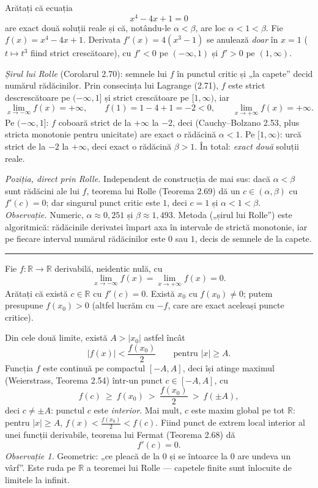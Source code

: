Arătați că ecuația
\[ x^{4}-4x+1=0 \]
are exact două soluții reale și că, notându-le $\alpha<\beta$, are loc $\alpha<1<\beta$.
\sol Fie $f(x)=x^{4}-4x+1$. Derivata $f'(x)=4(x^{3}-1)$ se anulează \emph{doar} în $x=1$ ($t\mapsto t^{3}$ fiind strict crescătoare), cu $f'<0$ pe $(-\infty,1)$ și $f'>0$ pe $(1,\infty)$.

\emph{Șirul lui Rolle} (Corolarul 2.70): semnele lui $f$ în punctul critic și „la capete'' decid numărul rădăcinilor. Prin consecința lui Lagrange (2.71), $f$ este strict descrescătoare pe $(-\infty,1]$ și strict crescătoare pe $[1,\infty)$, iar
\[ \lim_{x\to-\infty}f(x)=+\infty,\qquad f(1)=1-4+1=-2<0,\qquad \lim_{x\to+\infty}f(x)=+\infty . \]
Pe $(-\infty,1]$: $f$ coboară strict de la $+\infty$ la $-2$, deci (Cauchy--Bolzano 2.53, plus stricta monotonie pentru unicitate) are exact o rădăcină $\alpha<1$. Pe $[1,\infty)$: urcă strict de la $-2$ la $+\infty$, deci exact o rădăcină $\beta>1$. În total: \emph{exact două} soluții reale.

\emph{Poziția, direct prin Rolle.} Independent de construcția de mai sus: dacă $\alpha<\beta$ sunt rădăcini ale lui $f$, teorema lui Rolle (Teorema 2.69) dă un $c\in(\alpha,\beta)$ cu $f'(c)=0$; dar singurul punct critic este $1$, deci $c=1$ și $\alpha<1<\beta$.\\[2pt]
\emph{Observație.} Numeric, $\alpha\approx0{,}251$ și $\beta\approx1{,}493$. Metoda („șirul lui Rolle'') este algoritmică: rădăcinile derivatei împart axa în intervale de strictă monotonie, iar pe fiecare interval numărul rădăcinilor este $0$ sau $1$, decis de semnele de la capete.
\vspace{1mm}\hrule

Fie $f:\mathbb{R}\to\mathbb{R}$ derivabilă, neidentic nulă, cu
\[ \lim_{x\to-\infty}f(x)=\lim_{x\to+\infty}f(x)=0 . \]
Arătați că există $c\in\mathbb{R}$ cu $f'(c)=0$.
\sol Există $x_{0}$ cu $f(x_{0})\neq0$; putem presupune $f(x_{0})>0$ (altfel lucrăm cu $-f$, care are exact aceleași puncte critice).

Din cele două limite, există $A>|x_{0}|$ astfel încât
\[ |f(x)|<\frac{f(x_{0})}{2}\qquad\text{pentru }|x|\ge A . \]
Funcția $f$ este continuă pe compactul $[-A,A]$, deci își atinge maximul (Weierstrass, Teorema 2.54) într-un punct $c\in[-A,A]$, cu
\[ f(c)\ \ge\ f(x_{0})\ >\ \frac{f(x_{0})}{2}\ >\ f(\pm A) , \]
deci $c\neq\pm A$: punctul $c$ este \emph{interior}. Mai mult, $c$ este maxim global pe tot $\mathbb{R}$: pentru $|x|\ge A$, $f(x)<\frac{f(x_0)}{2}<f(c)$. Fiind punct de extrem local interior al unei funcții derivabile, teorema lui Fermat (Teorema 2.68) dă
\[ f'(c)=0 . \]
\emph{Observație 1.} Geometric: „ce pleacă de la $0$ și se întoarce la $0$ are undeva un vârf''. Este ruda pe $\mathbb{R}$ a teoremei lui Rolle --- capetele finite sunt înlocuite de limitele la infinit.

